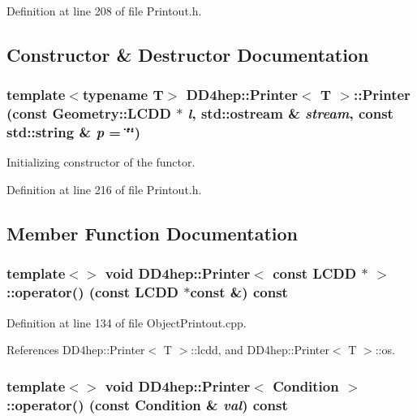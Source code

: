 Definition at line 208 of file Printout.h.

\subsection{Constructor \& Destructor Documentation}
\hypertarget{struct_d_d4hep_1_1_printer_accc6dac339dc1c219f32c0f2cdef6b70}{
\subsubsection[{Printer}]{\setlength{\rightskip}{0pt plus 5cm}template$<$typename T$>$ {\bf DD4hep::Printer}$<$ {\bf T} $>$::{\bf Printer} (const {\bf Geometry::LCDD} $\ast$ {\em l}, \/  std::ostream \& {\em stream}, \/  const std::string \& {\em p} = {\ttfamily \char`\"{}\char`\"{}})}}
\label{struct_d_d4hep_1_1_printer_accc6dac339dc1c219f32c0f2cdef6b70}


Initializing constructor of the functor. 

Definition at line 216 of file Printout.h.

\subsection{Member Function Documentation}
\hypertarget{struct_d_d4hep_1_1_printer_a4926e2d73384ba7456382d8da861efa6}{
\subsubsection[{operator()}]{\setlength{\rightskip}{0pt plus 5cm}template$<$$>$ void {\bf DD4hep::Printer}$<$ const {\bf LCDD} $\ast$ $>$::operator() (const {\bf LCDD} $\ast$const \&) const}}
\label{struct_d_d4hep_1_1_printer_a4926e2d73384ba7456382d8da861efa6}


Definition at line 134 of file ObjectPrintout.cpp.

References DD4hep::Printer$<$ T $>$::lcdd, and DD4hep::Printer$<$ T $>$::os.\hypertarget{struct_d_d4hep_1_1_printer_a07e2ce42a673e4d054442f6b4ebbc63c}{
\subsubsection[{operator()}]{\setlength{\rightskip}{0pt plus 5cm}template$<$$>$ void {\bf DD4hep::Printer}$<$ Condition $>$::operator() (const Condition \& {\em val}) const}}
\label{struct_d_d4hep_1_1_printer_a07e2ce42a673e4d054442f6b4ebbc63c}


